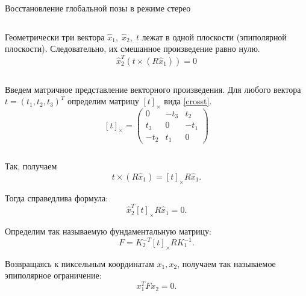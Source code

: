 \documentclass[9pt,aspectratio=169]{beamer}
\begin{document}
\begin{frame}{Восстановление глобальной позы в режиме стерео}

\begin{columns}
Геометрически три вектора $ \hat{x}_1,\; \hat{x}_2,\; t $
лежат в одной плоскости (эпиполярной плоскости). Следовательно,
их смешанное произведение равно нулю.
\[
\hat{x}_2^T \left( t \times (R \hat{x}_1) \right) = 0
\]
\end{columns}

\begin{columns}
Введем матричное представление
векторного произведения. Для любого вектора $t = (t_1, t_2, t_3)^T$
определим матрицу $[t]_\times$ вида \eqref{crosst}.
\begin{equation}\label{crosst}
[t]_\times =
\begin{pmatrix}
0 & -t_3 & t_2 \\
t_3 & 0 & -t_1 \\
-t_2 & t_1 & 0
\end{pmatrix}
\end{equation}
\end{columns}

Так, получаем
\[
t \times (R \hat{x}_1) = [t]_\times R \hat{x}_1.
\]

Тогда справедлива формула:
\[
\hat{x}_2^T [t]_\times R \hat{x}_1 = 0.
\]

Определим так называемую фундаментальную матрицу:
\[
F = K_2^{-T} [t]_\times R K_1^{-1}.
\]

Возвращаясь к пиксельным координатам \(x_1, x_2\),
получаем так называемое эпиполярное ограничение:
\[
x_1^T F x_2 = 0.
\]

\end{frame}
\end{document}
